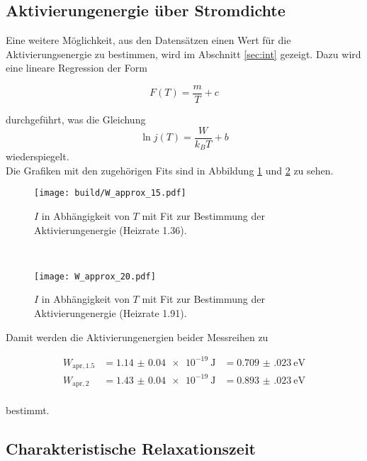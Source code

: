 \subsection{Aktivierungenergie über Stromdichte}

Eine weitere Möglichkeit, aus den Datensätzen einen Wert für die Aktivierungsenergie zu bestimmen, wird im Abschnitt \ref{sec:int} gezeigt. 
Dazu wird eine lineare Regression der Form 

\begin{equation}
    F(T) = \frac{m}{T} + c
\end{equation}

durchgeführt, was die Gleichung 
\begin{equation}
    \ln{j(T)} =\frac{W}{k_B T} + b
\end{equation} 
wiederspiegelt.
\\
Die Grafiken mit den zugehörigen Fits sind in Abbildung \ref{fig:apr15} und \ref{fig:apr20} zu sehen. 
\begin{figure}
    \centering
    \texttt{[image: build/W\_approx\_15.pdf]}
    \caption{$I$ in Abhängigkeit von $T$ mit Fit zur Bestimmung der Aktivierungenergie (Heizrate 1.36).}
    \label{fig:apr15}
\end{figure}
\\
\begin{figure}
    \centering
    \texttt{[image: W\_approx\_20.pdf]}
    \caption{$I$ in Abhängigkeit von $T$ mit Fit zur Bestimmung der Aktivierungenergie (Heizrate 1.91).}
    \label{fig:apr20}
\end{figure}
\FloatBarrier

Damit werden die Aktivierungenergien beider Messreihen zu 

\begin{align*}
    W_{\text{apr},1.5} &= \SI{1.14(4)e-19}{\joule} &= \SI{0.709(023)}{\electronvolt} \\
    W_{\text{apr},2}   &= \SI{1.43(4)e-19}{\joule} &= \SI{0.893(023)}{\electronvolt} \\
\end{align*}

bestimmt. 


\subsection{Charakteristische Relaxationszeit}

